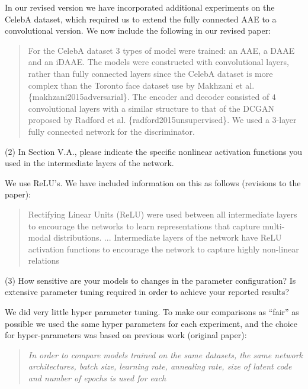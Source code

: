 \documentclass[a4paper,11pt]{article}
\begin{document}
In our revised version we have incorporated additional experiments on the CelebA dataset, which required us to extend the fully connected AAE to a convolutional version. We now include the following in our revised paper:

\begin{quote}
{\color{red}
For the CelebA dataset $3$ types of model were trained: an AAE, a DAAE and an iDAAE. The models were constructed with convolutional layers, rather than fully connected layers since the CelebA dataset is more complex than the Toronto face dataset use by Makhzani et al. \{makhzani2015adversarial\}. The encoder and decoder consisted of $4$ convolutional layers with a similar structure to that of the DCGAN proposed by Radford et al. \{radford2015unsupervised\}. We used a $3$-layer fully connected network for the discriminator. }
\end{quote}

{\color{blue}
(2) In Section V.A., please indicate the specific nonlinear activation functions you used in the intermediate layers of the network.}\newline


We use ReLU's. We have included information on this as follows (revisions to the paper):
    \begin{quote}
        {\color{red} Rectifying Linear Units (ReLU) were used between all intermediate layers to encourage the networks to learn representations that capture multi-modal distributions.} \newline
        ... \newline
            {\color{red}Intermediate layers of the network have ReLU activation functions to encourage the network to capture highly non-linear relations}
    \end{quote}


{\color{blue}
(3) How sensitive are your models to changes in the parameter configuration? Is extensive parameter tuning required in order to achieve your reported results?}\newline


We did very little hyper parameter tuning. To make our comparisons as ``fair'' as possible we used the same hyper parameters for each experiment, and the choice for hyper-parameters was based on previous work (original paper):
    
    \begin{quote}
        {\it In  order  to  compare  models trained on the same datasets, the same network architectures, batch size, learning rate, annealing rate, size of latent code and number of epochs is used for each}
    \end{quote}
\end{document}
